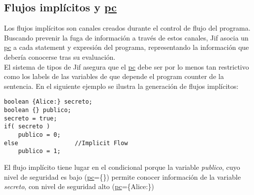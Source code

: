 \subsection{Flujos implícitos y \underline{pc}}
Los flujos implícitos son canales creados durante el control de flujo del
programa. Buscando prevenir la fuga de información a través de estos canales,
Jif asocia un \underline{pc} a cada statement y expresión del programa,
representando la información que debería conocerse tras su evaluación.\\
El sistema de tipos de Jif asegura que el \underline{pc} debe ser por
lo menos tan restrictivo como los labels de las variables de que depende el
program counter de la sentencia.\newline
En el siguiente ejemplo se ilustra la generación de flujos implícitos:
\begin{lstlisting}
boolean {Alice:} secreto;
boolean {} publico;
secreto = true;
if( secreto )		
	publico = 0;
else				//Implicit Flow
	publico = 1;
\end{lstlisting}

El flujo implícito tiene lugar en el condicional porque la variable
\emph{publico}, cuyo nivel de seguridad es bajo (\underline{pc}=\{\}) permite
conocer información de la variable \emph{secreto}, con nivel de seguridad alto
(\underline{pc}=\{Alice:\})















